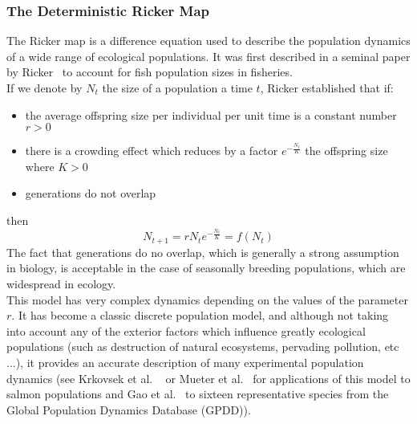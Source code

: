 \documentclass{article}
\begin{document}
	\subsubsection{The Deterministic Ricker Map}
	The Ricker map is a difference equation used to describe the population dynamics of a wide range of ecological populations. It was first described in a seminal paper by Ricker~\cite{Ricker1954} to account for fish population sizes in fisheries. \\
	If we denote by $N_t$ the size of a population a time $t$, Ricker established that if:
	\begin{itemize}
		\item the average offspring size per individual per unit time is a constant number $r > 0$
		\item there is a crowding effect which reduces by a factor $e^{-\frac{N_t}{K}}$ the offspring size where $K > 0$
		\item generations do not overlap
	\end{itemize}
	then 
	\begin{equation}
		N_{t+1} = r N_t e^{-\frac{N_t}{K}} = f(N_t)
		\label{eq:ricker}
	\end{equation}
	The fact that generations do no overlap, which is generally a strong assumption in biology, is acceptable in the case of seasonally breeding populations, which are widespread in ecology. \\
	This model has very complex dynamics depending on the values of the parameter $r$. It has become a classic discrete population model, and although not taking into account any of the exterior factors which influence greatly ecological populations (such as destruction of natural ecosystems, pervading pollution, etc ...), it provides an accurate description of many experimental population dynamics (see Krkovsek et al. ~\cite{krkovsek2007declining} or Mueter et al.~\cite{mueter2002opposite} for applications of this model to salmon populations and Gao et al.~\cite{gao2012bayesian} to sixteen representative species from the Global Population Dynamics Database (GPDD)). \\
	
\end{document}
